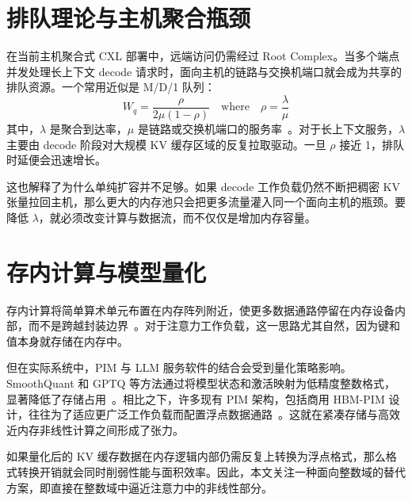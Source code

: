 \section{排队理论与主机聚合瓶颈}

在当前主机聚合式 CXL 部署中，远端访问仍需经过 Root Complex。当多个端点并发处理长上下文 decode 请求时，面向主机的链路与交换机端口就会成为共享的排队资源。一个常用近似是 M/D/1 队列：
\begin{equation}
\label{eq:queue}
W_q = \frac{\rho}{2\mu(1 - \rho)} \quad \text{where} \quad \rho = \frac{\lambda}{\mu}
\end{equation}
其中，$\lambda$ 是聚合到达率，$\mu$ 是链路或交换机端口的服务率~\cite{kleinrock}。对于长上下文服务，$\lambda$ 主要由 decode 阶段对大规模 KV 缓存区域的反复拉取驱动。一旦 $\rho$ 接近 1，排队时延便会迅速增长。

这也解释了为什么单纯扩容并不足够。如果 decode 工作负载仍然不断把稠密 KV 张量拉回主机，那么更大的内存池只会把更多流量灌入同一个面向主机的瓶颈。要降低 $\lambda$，就必须改变计算与数据流，而不仅仅是增加内存容量。

\section{存内计算与模型量化}

存内计算将简单算术单元布置在内存阵列附近，使更多数据通路停留在内存设备内部，而不是跨越封装边界~\cite{pim_survey}。对于注意力工作负载，这一思路尤其自然，因为键和值本身就存储在内存中。

\begin{sloppypar}
但在实际系统中，PIM 与 LLM 服务软件的结合会受到量化策略影响。SmoothQuant 和 GPTQ 等方法通过将模型状态和激活映射为低精度整数格式，显著降低了存储占用~\cite{llm_smoothquant, gptq}。相比之下，许多现有 PIM 架构，包括商用 HBM-PIM 设计，往往为了适应更广泛工作负载而配置浮点数据通路~\cite{samsung_pim}。这就在紧凑存储与高效近内存非线性计算之间形成了张力。
\end{sloppypar}

如果量化后的 KV 缓存数据在内存逻辑内部仍需反复上转换为浮点格式，那么格式转换开销就会同时削弱性能与面积效率。因此，本文关注一种面向整数域的替代方案，即直接在整数域中逼近注意力中的非线性部分。
